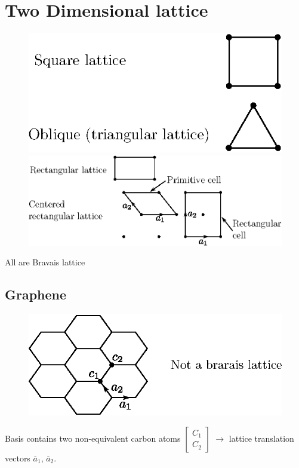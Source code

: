 \section*{Two Dimensional lattice}
\begin{figure}[H]
\includegraphics{images/lecture2/fig6.eps}

\medskip

\noindent
\includegraphics{images/lecture2/fig7.eps}
\end{figure}
All are Bravais lattice

\subsection*{Graphene}
\begin{figure}[H]
\centering
\includegraphics{images/lecture2/fig8.eps}
\end{figure}

Basis contains two non-equivalent carbon atoms $\left[\begin{smallmatrix} C_{1}\\ C_{2}\end{smallmatrix}\right]$ $\to$ lattice translation vectors $\overline{a}_{1}$, $\overline{a}_{2}$.



